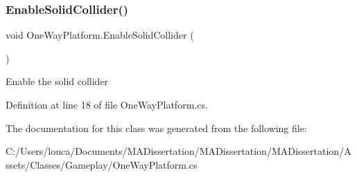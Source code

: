 \mbox{\label{class_one_way_platform_a10b0da79a1b619409a8186f9766bb810}} 
\subsubsection{\texorpdfstring{Enable\+Solid\+Collider()}{EnableSolidCollider()}}
{\footnotesize\ttfamily void One\+Way\+Platform.\+Enable\+Solid\+Collider (\begin{DoxyParamCaption}{ }\end{DoxyParamCaption})}



Enable the solid collider 



Definition at line 18 of file One\+Way\+Platform.\+cs.



The documentation for this class was generated from the following file\+:\begin{DoxyCompactItemize}
\item 
C\+:/\+Users/louca/\+Documents/\+M\+A\+Dissertation/\+M\+A\+Dissertation/\+M\+A\+Dissertation/\+Assets/\+Classes/\+Gameplay/One\+Way\+Platform.\+cs\end{DoxyCompactItemize}
